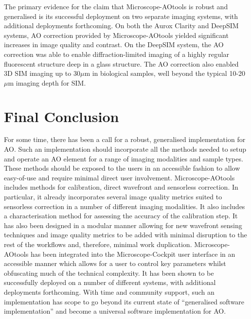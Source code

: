 The primary evidence for the claim that Microscope-AOtools is robust and 
generalised is its successful deployment on two separate imaging systems, 
with additional deployments forthcoming. On both the Aurox Clarity and 
DeepSIM systems, AO correction provided by Microscope-AOtools yielded 
significant increases in image quality and contrast. On the DeepSIM system, 
the AO correction was able to enable diffraction-limited imaging of a highly 
regular fluorescent structure deep in a glass structure. The AO correction 
also enabled 3D SIM imaging up to 30$\mu$m in biological samples, well beyond 
the typical 10-20$\mu$m imaging depth for 
SIM\cite{schermelleh2019super,wu2018faster}. 

\section{Final Conclusion}
\label{sec:final_conclusion}

For some time, there has been a call for a robust, generalised implementation 
for AO. Such an implementation should incorporate all the methods needed to
setup and operate an AO element for a range of imaging modalities and sample 
types. These methods should be exposed to the users in an accessible fashion 
to allow easy-of-use and require minimal direct user involvement. 
Microscope-AOtools includes methods for calibration, direct wavefront and 
sensorless correction. In particular, it already incorporates several image 
quality metrics suited to sensorless correction in a number of different 
imaging modalities. It also includes a characterisation method for assessing 
the accuracy of the calibration step. It has also been designed in a modular 
manner allowing for new wavefront sensing techniques and image quality 
metrics to be added with minimal disruption to the rest of the workflows and, 
therefore, minimal work duplication. Microscope-AOtools has been integrated 
into the Microscope-Cockpit user interface in an accessible manner which 
allows for a user to control key parameters whilst obfuscating much of the 
technical complexity. It has been shown to be successfully deployed on a 
number of different systems, with additional deployments forthcoming. With 
time and community support, such an implementation has scope to go beyond its 
current state of ``generalised software implementation'' and become a universal software implementation for AO.
